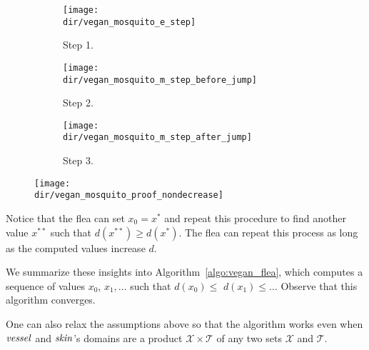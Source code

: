 \begin{figure}
\centering
\begin{subfigure}[b]{0.6\textwidth}
\centering
\texttt{[image: \\dir/vegan\_mosquito\_e\_step]}
\caption{Step 1.}
\label{fig:vegan_flea_opti_s1}
\end{subfigure}

\begin{subfigure}[p]{0.6\textwidth}
\centering
\texttt{[image: \\dir/vegan\_mosquito\_m\_step\_before\_jump]}
\caption{Step 2.}
\label{fig:vegan_flea_opti_s2}
\end{subfigure}

\begin{subfigure}[p]{0.6\textwidth}
\centering
        \texttt{[image: \\dir/vegan\_mosquito\_m\_step\_after\_jump]}
        \caption{Step 3.}
        \label{fig:vegan_flea_opti_s3}
\end{subfigure}
\caption{}
\label{fig:vegan_flea_opti_algo}
\end{figure}

\begin{figure}
\centering
\texttt{[image: \\dir/vegan\_mosquito\_proof\_nondecrease]}
\caption{}
\label{fig:vegan_flea_proof_non_decrease}
\end{figure}

Notice that the flea can set $x_0 = x^*$ and repeat this procedure to find another value $x^{**}$ such that $d(x^{**}) \geq d(x^*)$. The flea can repeat this process as long as the computed values increase $d$. 

We summarize these insights into Algorithm~\ref{algo:vegan_flea}, which computes a sequence of values $x_0$, $x_1, \ldots$ such that $d(x_0) \leq$ $d(x_1) \leq \ldots$ Observe that this algorithm converges. 

One can also relax the assumptions above so that the algorithm works even when $\mathit{vessel}$ and $\mathit{skin}$'s domains are a product $\mathcal{X} \times \mathcal{T}$ of any two sets $\mathcal{X}$ and $\mathcal{T}$.

